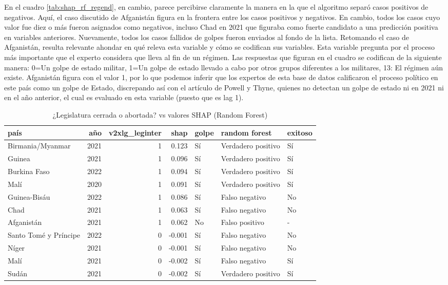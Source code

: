 \documentclass{article}
\begin{document}
En el cuadro \ref{tab:shap_rf_regend}, en cambio, parece percibirse claramente la manera en la que 
el algoritmo separó casos positivos de negativos. Aquí, el caso discutido de Afganistán figura en la
frontera entre los casos positivos y negativos. En cambio, todos los casos cuyo valor fue diez o más
fueron asignados como negativos, incluso Chad en 2021 que figuraba como fuerte candidato a una 
predicción positiva en variables anteriores. Nuevamente, todos los casos fallidos de golpes fueron
enviados al fondo de la lista. Retomando el caso de Afganistán, resulta relevante ahondar en qué releva
esta variable y cómo se codifican sus variables. Esta variable pregunta por el proceso más 
importante que el experto considera que lleva al fin de un régimen\cite{CopMet24}. Las respuestas que 
figuran en el cuadro se codifican de la siguiente manera: 0=Un golpe de estado militar, 1=Un golpe de 
estado llevado a cabo por otros grupos diferentes a los militares, 13: El régimen aún existe. Afganistán
figura con el valor 1, por lo que podemos inferir que los expertos de esta base de datos calificaron
el proceso político en este país como un golpe de Estado, discrepando así con el artículo de Powell y 
Thyne, quienes no detectan un golpe de estado ni en 2021 ni en el año anterior, el cual es evaluado
en esta variable (puesto que es lag 1).

\begin{table}[H]
  \centering
  \begin{tabular}{lrrrlll}
    \toprule
    país & año & v2xlg\_leginter & shap & golpe & random forest & exitoso \\
    \midrule
    Birmania/Myanmar & 2021 & 1 & 0.123 & Sí & Verdadero positivo & Sí \\
    Guinea & 2021 & 1 & 0.096 & Sí & Verdadero positivo & Sí \\
    Burkina Faso & 2022 & 1 & 0.094 & Sí & Verdadero positivo & Sí \\
    Malí & 2020 & 1 & 0.091 & Sí & Verdadero positivo & Sí \\
    Guinea-Bisáu & 2022 & 1 & 0.086 & Sí & Falso negativo & No \\
    Chad & 2021 & 1 & 0.063 & Sí & Falso negativo & No \\
    Afganistán & 2021 & 1 & 0.062 & No & Falso positivo & - \\
    Santo Tomé y Príncipe & 2022 & 0 & -0.001 & Sí & Falso negativo & No \\
    Níger & 2021 & 0 & -0.001 & Sí & Falso negativo & No \\
    Malí & 2021 & 0 & -0.002 & Sí & Falso negativo & Sí \\
    Sudán & 2021 & 0 & -0.002 & Sí & Verdadero positivo & Sí \\
    \bottomrule
    \end{tabular}
\caption{¿Legislatura cerrada o abortada? vs valores SHAP (Random Forest) \label{tab:shap_rf_leginter}}
\end{table}
\end{document}
